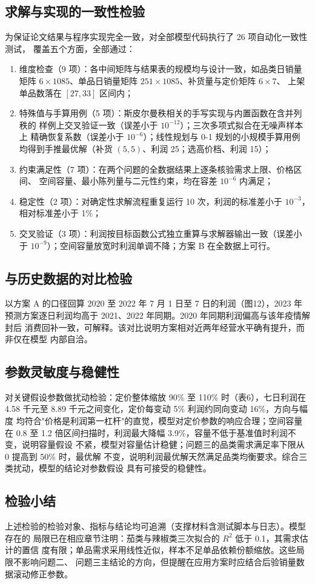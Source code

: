 
\subsection{求解与实现的一致性检验}

为保证论文结果与程序实现完全一致，对全部模型代码执行了 26 项自动化一致性测试，
覆盖五个方面，全部通过：

\begin{enumerate}[label=（\arabic*）]
\item 维度检查（9 项）：各中间矩阵与结果表的规模均与设计一致，如品类日销量矩阵
      $6\times1085$、单品日销量矩阵 $251\times1085$、补货量与定价矩阵 $6\times7$、
      上架单品数落在 $[27,33]$ 区间内；
\item 特殊值与手算用例（5 项）：斯皮尔曼秩相关的手写实现与内置函数在含并列秩的
      样例上交叉验证一致（误差小于 $10^{-12}$）；三次多项式拟合在无噪声样本上
      精确恢复系数（误差小于 $10^{-6}$）；线性规划与 0-1 规划的小规模手算用例
      均得到手推最优解（补货 $(5,5)$、利润 25；选高价档、利润 15）；
\item 约束满足性（7 项）：在两个问题的全数据结果上逐条核验需求上限、价格区间、
      空间容量、最小陈列量与二元性约束，均在容差 $10^{-6}$ 内满足；
\item 稳定性（2 项）：对确定性求解流程重复运行 10 次，利润的标准差小于 $10^{-3}$，
      相对标准差小于 1\%；
\item 交叉验证（3 项）：利润按目标函数公式独立重算与求解器输出一致（误差小于
      $10^{-9}$）；空间容量放宽时利润单调不降；方案 B 在全数据上可行。
\end{enumerate}

\subsection{与历史数据的对比检验}

以方案 A 的口径回算 2020 至 2022 年 7 月 1 日至 7 日的利润（图12），2023 年
预测方案逐日利润均高于 2021、2022 年同期。2020 年同期利润偏高与该年疫情解封后
消费回补一致，可解释。该对比说明方案相对近两年经营水平确有提升，而非仅在模型
内部自洽。

\subsection{参数灵敏度与稳健性}

对关键假设参数做扰动检验：定价整体缩放 90\% 至 110\% 时（表6），七日利润在
4.58 千元至 8.89 千元之间变化，定价每变动 5\% 利润约同向变动 16\%，方向与幅度
均符合"价格是利润第一杠杆"的直觉，模型对定价参数的响应合理；空间容量在 0.8 至
1.2 倍区间扫描时，利润最大降幅 3.9\%，容量不低于基准值时利润不变，说明容量假设
不紧，模型对容量估计稳健；问题三的品类需求满足率下限从 0 提高到 50\% 时，最优解
不变，说明利润最优解天然满足品类均衡要求。综合三类扰动，模型的结论对参数假设
具有可接受的稳健性。

\subsection{检验小结}

上述检验的检验对象、指标与结论均可追溯（支撑材料含测试脚本与日志）。模型存在的
局限已在相应章节注明：茄类与辣椒类三次拟合的 $R^2$ 低于 0.1，其需求估计的置信
度有限；单品需求采用线性近似，样本不足单品依赖份额缩放。这些局限不影响问题二、
问题三主结论的方向，但提醒在应用方案时应结合后验销量数据滚动修正参数。
